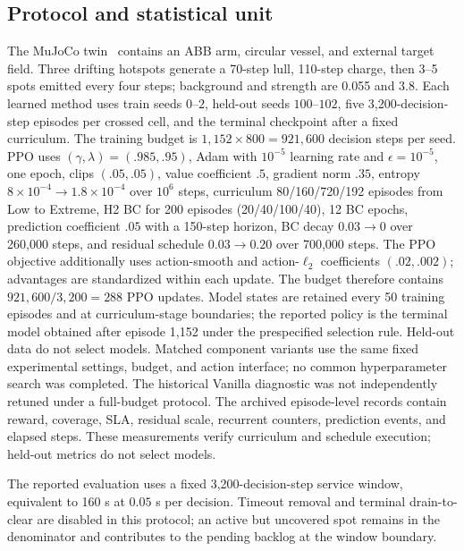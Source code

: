 \documentclass[conference]{IEEEtran}
\begin{document}
\subsection{Protocol and statistical unit}
The MuJoCo twin~\cite{mujoco2012physics} contains an ABB arm, circular vessel,
and external target field. Three drifting hotspots generate a 70-step lull,
110-step charge, then 3--5 spots emitted every four steps; background and
strength are 0.055 and 3.8. Each learned method uses train seeds $0$--$2$,
held-out seeds $100$--$102$, five 3,200-decision-step episodes per crossed
cell, and the terminal checkpoint after a fixed curriculum. The training
budget is $1,152\times800=921,600$ decision steps per seed. PPO uses
$(\gamma,\lambda)=(.985,.95)$, Adam with $10^{-5}$ learning rate and
$\epsilon=10^{-5}$, one epoch, clips $(.05,.05)$, value coefficient $.5$,
gradient norm $.35$, entropy
$8\times10^{-4}\rightarrow1.8\times10^{-4}$ over $10^6$ steps, curriculum
80/160/720/192 episodes from Low to Extreme, H2 BC for 200 episodes
(20/40/100/40), 12 BC epochs, prediction coefficient $.05$ with a 150-step horizon, BC
decay $0.03\rightarrow0$ over 260,000 steps, and residual schedule
$0.03\rightarrow0.20$ over 700,000 steps. The PPO objective additionally
uses action-smooth and action-$\ell_2$ coefficients $(.02,.002)$; advantages
are standardized within each update. The budget therefore contains
$921,600/3,200=288$ PPO updates. Model states are retained every 50
training episodes and at curriculum-stage boundaries; the reported policy is
the terminal
model obtained after episode 1,152 under the prespecified selection rule.
Held-out data do not select models. Matched component variants use the
same fixed experimental settings, budget, and action interface; no common
hyperparameter search was completed. The historical Vanilla diagnostic was
not independently retuned under a full-budget protocol. The archived
episode-level records contain reward, coverage, SLA, residual scale, recurrent
counters, prediction events, and elapsed steps. These measurements verify
curriculum and schedule execution; held-out metrics do not select models.

The reported evaluation uses a fixed 3,200-decision-step service window,
equivalent to 160 s at $0.05$ s per decision. Timeout removal and
terminal drain-to-clear are disabled in this protocol; an active but
uncovered spot remains in the denominator and contributes to the pending
backlog at the window boundary.
\end{document}
